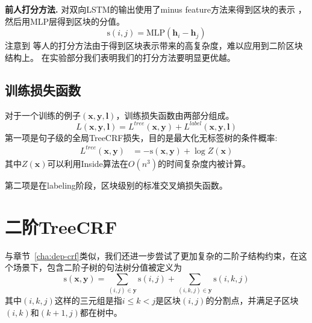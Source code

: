 \noindent\textbf{前人打分方法.}
\citet{stern-etal-2017-minimal}对双向LSTM的输出使用了minus feature方法来得到区块的表示 \citep{wang-chang-2016-graph,cross-huang-2016-span}，然后用MLP层得到区块的分值。
\begin{equation} \label{eq:minus-score}
	\mathrm{s}(i,j)=\mathrm{MLP}(\mathbf{h}_{i}-\mathbf{h}_{j})
\end{equation}
注意到 \citet{stern-etal-2017-minimal}等人的打分方法由于得到区块表示带来的高复杂度，难以应用到二阶区块结构上。
在实验部分我们表明我们的打分方法要明显更优越。

\subsection{训练损失函数}

对于一个训练的例子$(\boldsymbol{x},\boldsymbol{y},\boldsymbol{l})$，训练损失函数由两部分组成。
\begin{equation} \label{eq:final-loss}
	\mathit{L}(\boldsymbol{x}, \boldsymbol{y}, \boldsymbol{l}) = \mathit{L}^{tree}(\boldsymbol{x}, \boldsymbol{y}) + \mathit{L}^{label}(\boldsymbol{x}, \boldsymbol{y}, \boldsymbol{l})
\end{equation}
第一项是句子级的全局TreeCRF损失，目的是最大化无标签树的条件概率:
\begin{equation}\label{eq:bracket-loss}
	\begin{split}
		\mathit{L}^{tree}(\boldsymbol{x},\boldsymbol{y})
		&= -\mathrm{s}(\boldsymbol{x}, \boldsymbol{y}) + \log Z(\boldsymbol{x})
	\end{split}
\end{equation}
其中$Z(\boldsymbol{x})$可以利用Inside算法在$O(n^3)$的时间复杂度内被计算。

第二项是在labeling阶段，区块级别的标准交叉熵损失函数。

\section{二阶TreeCRF}
\label{sec:con-2o-treecrf}

与章节~\ref{cha:dep-crf}类似，我们还进一步尝试了更加复杂的二阶子结构约束，在这个场景下，包含二阶子树的句法树分值被定义为
\begin{equation} \label{eq:2ostree-score}
	\mathrm{s}(\boldsymbol{x},\boldsymbol{y}) = \sum\limits_{(i,j)\in \boldsymbol{y}}\mathrm{s}(i,j)+\sum\limits_{(i,k,j)\in \boldsymbol{y}}\mathrm{s}(i,k,j)
\end{equation}
其中$(i,k,j)$这样的三元组是指$i \leq k < j$是区块$(i,j)$的分割点，并满足子区块$(i,k)$和$(k+1,j)$都在树中。

